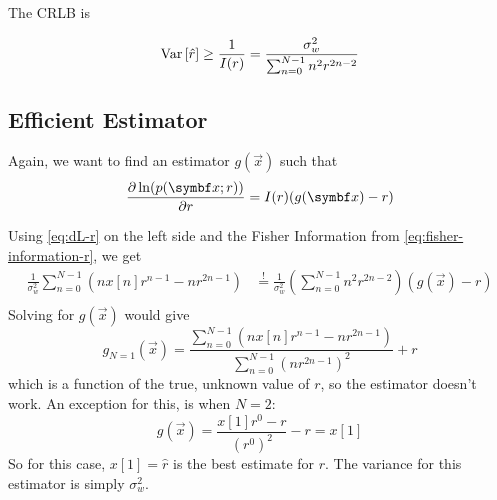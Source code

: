 The \acs{CRLB} is
\begin{boxed-block}
\begin{equation}
\mathrm{Var}\left[\hat r\right] \geq \frac{1}{I(r)} = \frac{\sigma_w^2}{\sum_{n=0}^{N-1} n^2r^{2n-2}}
\end{equation}
\end{boxed-block}

\subsection{Efficient Estimator}

Again, we want to find an estimator $g(\vec{x})$ such that
\begin{equation}
    \pd[\ln(p(\vec{x};r))]{r}=I(r)(g(\vec{x})-r)
\end{equation}

Using \autoref{eq:dL-r} on the left side and the Fisher Information from \autoref{eq:fisher-information-r}, we get
\begin{align*}
    \frac{1}{\sigma_w^2}\sum_{n=0}^{N-1} (nx[n]r^{n-1} - nr^{2n-1})
    &\overset{!}{=} \frac{1}{\sigma_w^2} \left(\sum_{n=0}^{N-1} n^2r^{2n-2}\right)(g(\vec{x}) - r) \\
\end{align*}
Solving for $g(\vec{x})$ would give
\[
g_{N=1}(\vec x) = \frac{\sum_{n=0}^{N-1} (nx[n]r^{n-1} - nr^{2n-1})}{\sum_{n=0}^{N-1} (nr^{2n-1})^2} + r
\]
which is a function of the true, unknown value of $r$, so the estimator doesn't work. An exception for this, is when $N = 2$:
\[
g(\vec{x}) = \frac{x[1]r^0 - r}{(r^0)^2} - r = x[1]
\]
So for this case, $x[1]=\hat r$ is the best estimate for $r$. The variance for this estimator is simply $\sigma_w^2$.
